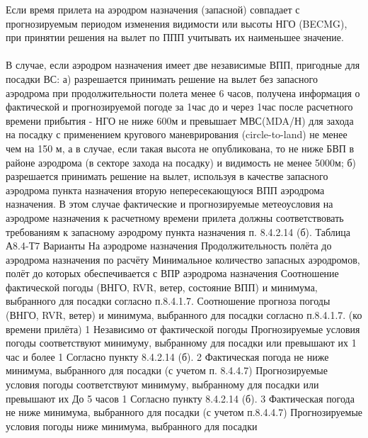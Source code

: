 Если время прилета на аэродром назначения (запасной) совпадает с прогнозируемым периодом изменения видимости или высоты НГО (BECMG), при принятии решения на вылет по ППП учитывать их наименьшее значение.

\paragraph{} \label{par:altex}В случае, если аэродром назначения имеет две независимые ВПП, пригодные для посадки ВС: 
а)	разрешается принимать решение на вылет без запасного аэродрома при продолжительности полета менее 6 часов, получена информация о фактической и прогнозируемой погоде за 1час до и через 1час после расчетного времени прибытия - НГО не ниже 600м и превышает МВС(MDA/Н) для захода на посадку с применением кругового маневрирования (circle-to-land) не менее чем на 150 м, а в случае, если такая высота не опубликована, то не ниже БВП в районе аэродрома (в секторе захода на посадку) и видимость не менее 5000м; 
б)	разрешается принимать решение на вылет, используя в качестве запасного аэродрома пункта назначения вторую непересекающуюся ВПП аэродрома назначения. В этом случае фактические и прогнозируемые метеоусловия на аэродроме назначения к расчетному времени прилета должны соответствовать требованиям к запасному аэродрому пункта назначения п. 8.4.2.14 (б).                                                               Таблица А8.4-Т7                                                                                                                                                   
Варианты	На аэродроме назначения	
Продолжительность полёта 
до аэродрома назначения 
по расчёту	Минимальное количество запасных аэродромов, полёт до которых обеспечивается с ВПР аэродрома назначения
	Соотношение фактической погоды (ВНГО, RVR, ветер, состояние ВПП) и минимума, выбранного для посадки согласно п.8.4.1.7.	Соотношение прогноза погоды (ВНГО, RVR, ветер) и минимума, выбранного для посадки согласно п.8.4.1.7.
(ко времени прилёта) 		
1	Независимо от фактической погоды	Прогнозируемые условия погоды соответствуют минимуму, выбранному для посадки или превышают их	1 час и более
	1
Согласно пункту 8.4.2.14 (б).
2	Фактическая погода 
не ниже минимума, выбранного для посадки (с учетом п. 8.4.4.7)	Прогнозируемые условия погоды соответствуют минимуму, выбранному для посадки или превышают их	До 5 часов	1
Согласно пункту 8.4.2.14 (б).
3	Фактическая погода 
не ниже минимума, выбранного для посадки (с учетом п.8.4.4.7)	Прогнозируемые условия погоды ниже минимума, выбранного для посадки	
